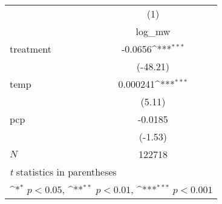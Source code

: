 {
\def\sym#1{\ifmmode^{#1}\else\(^{#1}\)\fi}
\begin{tabular}{l*{1}{c}}
\hline\hline
            &\multicolumn{1}{c}{(1)}\\
            &\multicolumn{1}{c}{log\_mw}\\
\hline
treatment   &     -0.0656\sym{***}\\
            &    (-48.21)         \\
[1em]
temp        &    0.000241\sym{***}\\
            &      (5.11)         \\
[1em]
pcp         &     -0.0185         \\
            &     (-1.53)         \\
\hline
\(N\)       &      122718         \\
\hline\hline
\multicolumn{2}{l}{\footnotesize \textit{t} statistics in parentheses}\\
\multicolumn{2}{l}{\footnotesize \sym{*} \(p<0.05\), \sym{**} \(p<0.01\), \sym{***} \(p<0.001\)}\\
\end{tabular}
}
